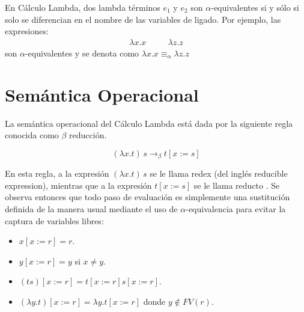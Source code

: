 \documentclass[12pt]{extarticle}
\begin{document}
\begin{definition} En Cálculo Lambda, dos lambda términos $e_1$ y $e_2$ son $\alpha$-equivalentes si y sólo si solo se diferencian en el nombre de las variables de ligado. Por ejemplo, las expresiones:
\[
    \begin{array}{ccc}
    \lambda x.x &\quad& \lambda z.z
    \end{array}
\]
\noindent
son $\alpha$-equivalentes y se denota como $\lambda x.x\equiv_{\alpha}\lambda z.z$
\end{definition}

\section{Semántica Operacional}
    \begin{definition} La semántica operacional del Cálculo Lambda está dada por la siguiente regla conocida como $\beta$ reducción.

    $$(\lambda x.t)\,s \to_\beta t[x:=s]$$

    En esta regla, a la expresión $(\lambda x.t)\,s$ se le llama redex (del
    inglés reducible expression), mientras que a la expresión $t[x:=s]$ se le llama reducto . Se observa entonces que todo paso de
    evaluación es simplemente una sustitución definida de la manera usual
    mediante el uso de $\alpha$-equivalencia para evitar la captura de
    variables libres:
        \begin{itemize}
        \item $x[x:=r] = r$. 
        \item $y[x:=r] = y$ si $x\neq y$.
        \item $(ts)[x:=r] = t[x:=r]s[x:=r]$.
        \item $(\lambda y.t)[x:=r] = \lambda y.t[x:=r]$ donde $y\notin FV(r)$.
        \end{itemize}
    \end{definition}

    \newpage
\end{document}
